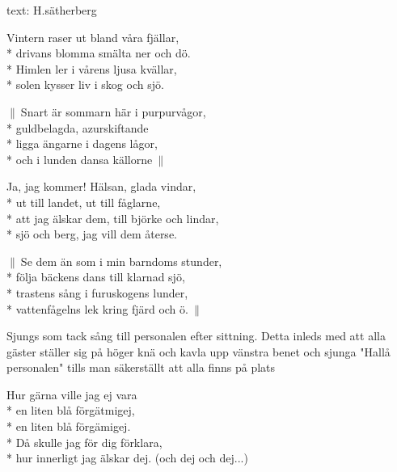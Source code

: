 \begin{SongText}
    \begin{SongInfo}
        text: H.sätherberg
    \end{SongInfo}
    \begin{SongVerse}
        Vintern raser ut bland våra fjällar,\\*%
        drivans blomma smälta ner och dö.\\*%
        Himlen ler i vårens ljusa kvällar,\\*%
        solen kysser liv i skog och sjö.
    \end{SongVerse}
    \begin{SongVerse}
        $\|\:$Snart är sommarn här i purpurvågor,\\*%
        guldbelagda, azurskiftande\\*%
        ligga ängarne i dagens lågor,\\*%
        och i lunden dansa källorne$\:\|$
    \end{SongVerse}
    \begin{SongVerse}
        Ja, jag kommer! Hälsan, glada vindar,\\*%
        ut till landet, ut till fåglarne,\\*%
        att jag älskar dem, till björke och lindar,\\*%
        sjö och berg, jag vill dem återse.
    \end{SongVerse}
    \begin{SongVerse}
        $\|\:$Se dem än som i min barndoms stunder,\\*%
        följa bäckens dans till klarnad sjö,\\*%
        trastens sång i furuskogens lunder,\\*%
        vattenfågelns lek kring fjärd och ö.$\:\|$
    \end{SongVerse}
\end{SongText}

\begin{SongText}
    \begin{SongInfo}
        Sjungs som tack sång till personalen efter sittning.
        Detta inleds med att alla gäster ställer sig på höger knä och kavla upp vänstra benet och sjunga "Hallå personalen" tills man säkerställt att alla finns på plats
    \end{SongInfo}
    \begin{SongVerse}
        Hur gärna ville jag ej vara\\*%
        en liten blå förgätmigej,\\*%
        en liten blå förgämigej.\\*%
        Då skulle jag för dig förklara,\\*%
        hur innerligt jag älskar dej. (och dej och dej...)
    \end{SongVerse}
\end{SongText}

